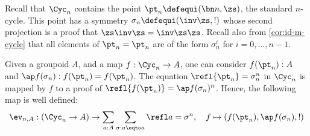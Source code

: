 Recall that $\Cyc_n$ contains the point $\pt_n \defequi (\bn n, \zs)$,
\ie the standard $n$-cycle. This
point has a symmetry $\sigma_n \defequi (\inv\zs, !)$ whose second projection is a
proof that $\zs\inv\zs = \inv\zs\zs$.
%
Recall also from \cref{cor:id-m-cycle} that all elements of $\pt_n = \pt_n$ are
of the form $\sigma_n^i$ for $i=0,\dots,n-1$.

Given a groupoid $A$, and a map $f :
\Cyc_n \to A$, one can consider $f(\pt_n):A$ and $\ap f (\sigma_n): f(\pt_n) =
f(\pt_n)$. The equation $\refl {\pt_n} = \sigma_n^n$ in
$\Cyc_n$ is mapped by $f$ to a proof of $\refl {f(\pt_n)} =
\ap f(\sigma_n)^n$. Hence, the following map is well defined:
\begin{displaymath}
  \ev_{n,A} : (\Cyc_n \to A) \to \sum_{a:A}\sum_{\sigma:a\eqto a}\refl a = \sigma^n,\quad
  f \mapsto (f(\pt_n), \ap f (\sigma_n), !)
\end{displaymath}

